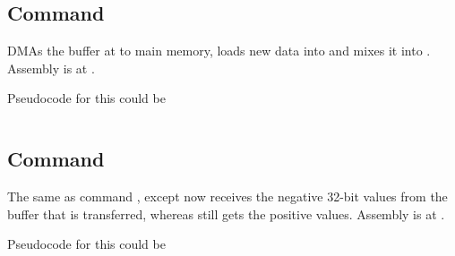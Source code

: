 \inputminted{c}{../ucode/command_f.c}

\subsection{Command }

DMAs the buffer at  to main memory, loads new data into  and mixes it into . Assembly is at .

Pseudocode for this could be 

\inputminted{c}{../ucode/command_10.c}

\subsection{Command }

The same as command , except now  receives the negative 32-bit values from the buffer that is transferred, whereas  still gets the positive values. Assembly is at .

Pseudocode for this could be 

\inputminted{c}{../ucode/command_11.c}